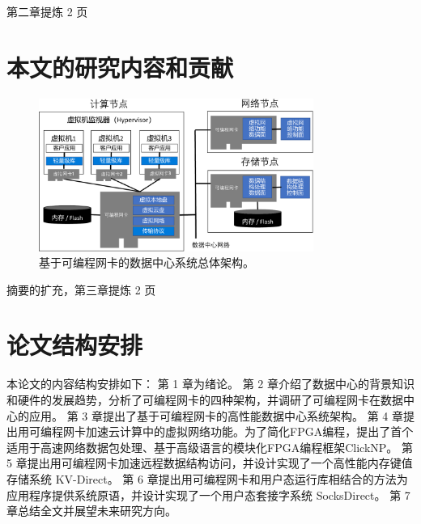 第二章提炼 2 页

\section{本文的研究内容和贡献}



\begin{figure}[htbp]
	\centering
	\includegraphics[width=0.8\textwidth]{figures/accel_arch.pdf}
	\caption{基于可编程网卡的数据中心系统总体架构。}
	\label{arch:fig:accel-arch}
\end{figure}

摘要的扩充，第三章提炼 2 页

\section{论文结构安排}

本论⽂的内容结构安排如下：
第 1 章为绪论。
第 2 章介绍了数据中心的背景知识和硬件的发展趋势，分析了可编程网卡的四种架构，并调研了可编程网卡在数据中心的应用。
第 3 章提出了基于可编程网卡的高性能数据中心系统架构。
第 4 章提出用可编程网卡加速云计算中的虚拟网络功能。为了简化FPGA编程，提出了首个适用于高速网络数据包处理、基于高级语言的模块化FPGA编程框架ClickNP。
第 5 章提出用可编程网卡加速远程数据结构访问，并设计实现了一个高性能内存键值存储系统 KV-Direct。
第 6 章提出用可编程网卡和用户态运行库相结合的方法为应用程序提供系统原语，并设计实现了一个用户态套接字系统 SocksDirect。
第 7 章总结全⽂并展望未来研究方向。